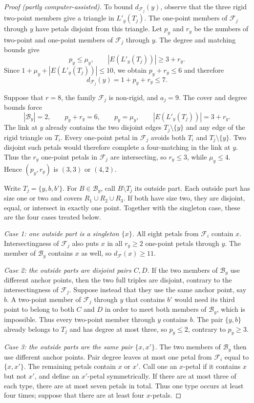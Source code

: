 \documentclass[11pt]{article}
\numberwithin{equation}{section}
\theoremstyle{definition}
\theoremstyle{remark}
\newcommand{\F}{\mathcal F}
\newcommand{\B}{\mathcal B}
\begin{document}
\begin{proof}[Proof (partly computer-assisted)]
To bound $d_{\F_j}(y)$, observe that the three rigid two-point members give a
triangle in $L'_y(T_j)$. The one-point members of $\F_j$ through $y$ have petals
disjoint from this triangle. Let $p_y$ and $r_y$ be the numbers of two-point
and one-point members of $\F_j$ through $y$. The degree and matching bounds
give
\[
 p_y\le\mu_y,
 \qquad
 |E(L'_y(T_j))|\ge3+r_y.
\]
Since $1+\mu_y+|E(L'_y(T_j))|\le10$, we obtain
$p_y+r_y\le6$ and therefore
\[
 d_{\F_j}(y)=1+p_y+r_y\le7.
\]

Suppose that $r=8$, the family $\F_j$ is non-rigid, and $a_j=9$. The cover and
degree bounds force
\[
 |\B_y|=2,
 \qquad
 p_y+r_y=6,
 \qquad
 p_y=\mu_y,
 \qquad
 |E(L'_y(T_j))|=3+r_y.
\]
The link at $y$ already contains the two disjoint edges
$T_j\setminus\{y\}$ and any edge of the rigid triangle on $T_i$. Every
one-point petal in $\F_j$ avoids both $T_i$ and
$T_j\setminus\{y\}$. Two disjoint such petals would therefore complete a
four-matching in the link at $y$. Thus the $r_y$ one-point petals in
$\F_j$ are intersecting, so $r_y\le3$, while $\mu_y\le4$. Hence
$(p_y,r_y)$ is $(3,3)$ or $(4,2)$.

Write $T_j=\{y,b,b'\}$. For $B\in\B_y$, call $B\setminus T_j$ its outside
part. Each outside part has size one or two and covers
$R_1\cup R_2\cup R_3$. If both have size two, they are disjoint, equal, or
intersect in exactly one point. Together with the singleton case, these are
the four cases treated below.

\emph{Case 1: one outside part is a singleton $\{x\}$.}  All eight petals
from $\F_i$ contain $x$.
Intersectingness of $\F_j$ also puts $x$ in all $r_y\ge2$ one-point petals
through $y$. The member of $\B_y$ contains $x$ as well, so
$d_{\F}(x)\ge11$.

\emph{Case 2: the outside parts are disjoint pairs $C,D$.}  If the two
members of $\B_y$ use different anchor points, then the two full triples are
disjoint, contrary to the intersectingness of $\F_j$. Suppose instead that they use
the same anchor point, say $b$. A two-point member of $\F_j$ through $y$
that contains $b'$ would need its third point to belong to both $C$ and $D$
in order to meet both members of $\B_y$, which is impossible. Thus every
two-point member through $y$ contains $b$. The pair $\{y,b\}$ already
belongs to $T_j$ and has degree at most three, so $p_y\le2$, contrary to
$p_y\ge3$.

\emph{Case 3: the outside parts are the same pair $\{x,x'\}$.}  The two
members of $\B_y$ then use different anchor points.
Pair degree leaves at most one petal from $\F_i$ equal to $\{x,x'\}$. The
remaining petals contain $x$ or $x'$. Call one an $x$-petal if it contains
$x$ but not $x'$, and define an $x'$-petal symmetrically. If there are at
most three of each type, there are at most seven petals in total. Thus one
type occurs at least four times; suppose that there are at least four
$x$-petals.


\end{proof}
\end{document}
